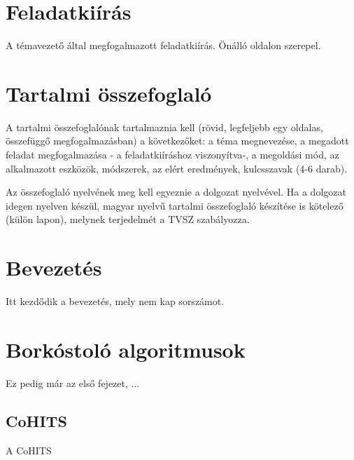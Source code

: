 \documentclass[12pt]{report}
\theoremstyle{definition}
\begin{document}
\chapter*{Feladatkiírás}

A témavezető által megfogalmazott feladatkiírás. Önálló oldalon szerepel.

\chapter*{Tartalmi összefoglaló}

A tartalmi összefoglalónak tartalmaznia kell (rövid, legfeljebb egy oldalas, összefüggő megfogalmazásban)
a következőket: a téma megnevezése, a megadott feladat megfogalmazása - a feladatkiíráshoz viszonyítva-,
a megoldási mód, az alkalmazott eszközök, módszerek, az elért eredmények, kulcsszavak (4-6 darab).

Az összefoglaló nyelvének meg kell egyeznie a dolgozat nyelvével. Ha a dolgozat idegen nyelven készül,
magyar nyelvű tartalmi összefoglaló készítése is kötelező (külön lapon), melynek terjedelmét a TVSZ szabályozza.


\chapter*{Bevezetés}

Itt kezdődik a bevezetés, mely nem kap sorszámot.



\chapter{Borkóstoló algoritmusok}

Ez pedig már az első fejezet, ...

\section{CoHITS}
A CoHITS


\end{document}
